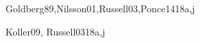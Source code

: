 \begin{syllabus}
\begin{unit}{\ISAdvancedSearch}{}{Goldberg89,Nilsson01,Russell03,Ponce14}{18}{a,j}
\begin{topics}
    \item \ISAdvancedSearchTopicStochastic
    \item \ISAdvancedSearchTopicConstructing
    \item \ISAdvancedSearchTopicImplementation
    \item \ISAdvancedSearchTopicMinimax
    \item \ISAdvancedSearchTopicExpectimax
\end{topics}
\begin{learningoutcomes}
    \item \ISAdvancedSearchLODesignAndGenetic [\Usage]
    \item \ISAdvancedSearchLODesignAndSimulated [\Usage]
    \item \ISAdvancedSearchLODesignAndBeam [\Usage]
    \item \ISAdvancedSearchLOApplyMinimax [\Usage]
    \item \ISAdvancedSearchLOCompareAndAlgorithms [\Usage]
    \item \ISAdvancedSearchLOCompareAndHeuristic [\Usage]
\end{learningoutcomes}
\end{unit}

\begin{unit}{\ISReasoningUnderUncertainty}{}{Koller09, Russell03}{18}{a,j}
\begin{topics}
    \item \ISReasoningUnderUncertaintyTopicReview
    \item \ISReasoningUnderUncertaintyTopicRandom
    \item \ISReasoningUnderUncertaintyTopicConditional
    \item \ISReasoningUnderUncertaintyTopicKnowledge
\end{topics}
\begin{learningoutcomes}
    \item \ISReasoningUnderUncertaintyLOApplyBayesDetermine [\Usage]
    \item \ISReasoningUnderUncertaintyLOExplainHowAssertions [\Usage]
    \item \ISReasoningUnderUncertaintyLOIdentifyExamplesRepresentations [\Usage]
    \item \ISReasoningUnderUncertaintyLOStateTheExact [\Usage]
\end{learningoutcomes}
\end{unit}


\end{syllabus}
